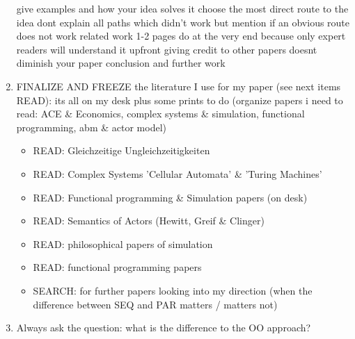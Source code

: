 \begin{enumerate}
		give examples and how your idea solves it
		choose the most direct route to the idea
			dont explain all paths which didn't work
			but mention if an obvious route does not work
	related work 1-2 pages
		do at the very end because only expert readers will understand it upfront
		giving credit to other papers doesnt diminish your paper
	conclusion and further work


\item FINALIZE AND FREEZE the literature I use for my paper (see next items READ): its all on my desk plus some prints to do (organize papers i need to read: ACE \& Economics, complex systems \& simulation, functional programming, abm \& actor model)
	\begin{itemize}
		\item READ: Gleichzeitige Ungleichzeitigkeiten
		\item READ: Complex Systems 'Cellular Automata' \& 'Turing Machines'
		\item READ: Functional programming \& Simulation papers (on desk)
		\item READ: Semantics of Actors (Hewitt, Greif \& Clinger)
		\item READ: philosophical papers of simulation
		\item READ: functional programming papers
		\item SEARCH: for further papers looking into my direction (when the difference between SEQ and PAR matters / matters not)
	\end{itemize}

\item Always ask the question: what is the difference to the OO approach? 
\end{enumerate} 

